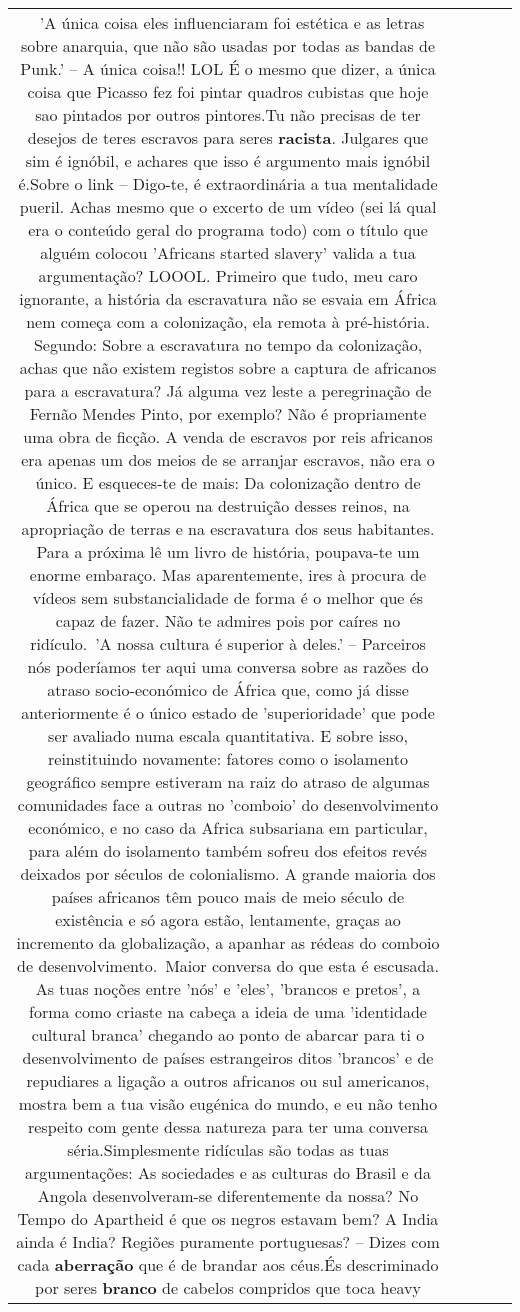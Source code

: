 \documentclass[11pt]{article}
\newlength\mylength
\begin{document}
\begin{center}
\begin{longtable}{|C{.65\mylength}|C{.30\mylength}|C{.12\mylength}|C{.12\mylength}|C{.12\mylength}|}
  \small {} 'A única coisa eles influenciaram foi estética e as letras sobre anarquia, que não são usadas por todas as bandas de Punk.' – A única coisa!! LOL É o mesmo que dizer, a única coisa que Picasso fez foi pintar quadros cubistas que hoje sao pintados por outros pintores.Tu não precisas de ter desejos de teres escravos para seres \textbf{racista}. Julgares que sim é ignóbil, e achares que isso é argumento mais ignóbil é.Sobre o link – Digo-te, é extraordinária a tua mentalidade pueril. Achas mesmo que o excerto de um vídeo (sei lá qual era o conteúdo geral do programa todo) com o título que alguém colocou 'Africans started slavery' valida a tua argumentação? LOOOL. Primeiro que tudo, meu caro ignorante, a história da escravatura não se esvaia em África nem começa com a colonização, ela remota à pré-história. Segundo: Sobre a escravatura no tempo da colonização, achas que não existem registos sobre a captura de africanos para a escravatura? Já alguma vez leste a peregrinação de Fernão Mendes Pinto, por exemplo? Não é propriamente uma obra de ficção. A venda de escravos por reis africanos era apenas um dos meios de se arranjar escravos, não era o único. E esqueces-te de mais: Da colonização dentro de África que se operou na destruição desses reinos, na apropriação de terras e na escravatura dos seus habitantes. Para a próxima lê um livro de história, poupava-te um enorme embaraço. Mas aparentemente, ires à procura de vídeos sem substancialidade de forma é o melhor que és capaz de fazer. Não te admires pois por caíres no ridículo. 'A nossa cultura é superior à deles.' – Parceiros nós poderíamos ter aqui uma conversa sobre as razões do atraso socio-económico de África que, como já disse anteriormente é o único estado de 'superioridade' que pode ser avaliado numa escala quantitativa. E sobre isso, reinstituindo novamente: fatores como o isolamento geográfico sempre estiveram na raiz do atraso de algumas comunidades face a outras no 'comboio' do desenvolvimento económico, e no caso da Africa subsariana em particular, para além do isolamento também sofreu dos efeitos revés deixados por séculos de colonialismo. A grande maioria dos países africanos têm pouco mais de meio século de existência e só agora estão, lentamente, graças ao incremento da globalização, a apanhar as rédeas do comboio de desenvolvimento. Maior conversa do que esta é escusada. As tuas noções entre 'nós' e 'eles', 'brancos e pretos', a forma como criaste na cabeça a ideia de uma 'identidade cultural branca' chegando ao ponto de abarcar para ti o desenvolvimento de países estrangeiros ditos 'brancos' e de repudiares a ligação a outros africanos ou sul americanos, mostra bem a tua visão eugénica do mundo, e eu não tenho respeito com gente dessa natureza para ter uma conversa séria.Simplesmente ridículas são todas as tuas argumentações: As sociedades e as culturas do Brasil e da Angola desenvolveram-se diferentemente da nossa? No Tempo do Apartheid é que os negros estavam bem? A India ainda é India? Regiões puramente portuguesas? – Dizes com cada \textbf{aberração} que é de brandar aos céus.És descriminado por seres \textbf{branco} de cabelos compridos que toca heavy 
\end{longtable}
\end{center}
\end{document}

